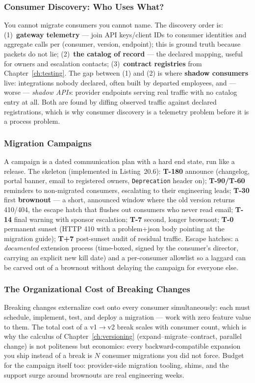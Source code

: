 \subsubsection{Consumer Discovery: Who Uses What?}
You cannot migrate consumers you cannot name. The discovery order is:
(1)~\textbf{gateway telemetry} --- join API keys/client IDs to consumer
identities and aggregate calls per (consumer, version, endpoint); this is
ground truth because packets do not lie; (2)~\textbf{the catalog of
record} --- the declared mapping, useful for owners and escalation
contacts; (3)~\textbf{contract registries} from
Chapter~\ref{ch:testing}. The gap between (1) and (2) is where
\textbf{shadow consumers} live: integrations nobody declared, often built
by departed employees, and --- worse --- \emph{shadow APIs}: provider
endpoints serving real traffic with no catalog entry at all. Both are
found by diffing observed traffic against declared registrations, which is
why consumer discovery is a telemetry problem before it is a process
problem.

\subsubsection{Migration Campaigns}
A campaign is a dated communication plan with a hard end state, run like a
release. The skeleton (implemented in Listing~20.6):
\textbf{T-180} announce (changelog, portal banner, email to registered
owners, \texttt{Deprecation} header on); \textbf{T-90/T-60} reminders to
non-migrated consumers, escalating to their engineering leads;
\textbf{T-30} first \textbf{brownout} --- a short, announced window where
the old version returns 410/404, the escape hatch that flushes out
consumers who never read email; \textbf{T-14} final warning with sponsor
escalation; \textbf{T-7} second, longer brownout; \textbf{T-0} permanent
sunset (HTTP 410 with a problem+json body pointing at the migration
guide); \textbf{T+7} post-sunset audit of residual traffic. Escape
hatches: a \emph{documented} extension process (time-boxed, signed by the
consumer's director, carrying an explicit new kill date) and a per-consumer
allowlist so a laggard can be carved out of a brownout without delaying
the campaign for everyone else.

\subsubsection{The Organizational Cost of Breaking Changes}
Breaking changes externalize cost onto every consumer simultaneously:
each must schedule, implement, test, and deploy a migration --- work with
zero feature value to them. The total cost of a v1$\rightarrow$v2 break
scales with consumer count, which is why the calculus of
Chapter~\ref{ch:versioning} (expand--migrate--contract, parallel change)
is not politeness but economics: every backward-compatible expansion you
ship instead of a break is $N$ consumer migrations you did not force.
Budget for the campaign itself too: provider-side migration tooling,
shims, and the support surge around brownouts are real engineering weeks.

